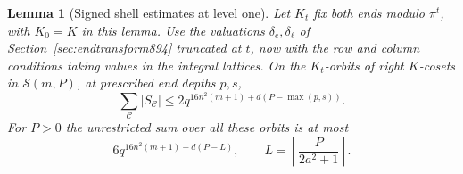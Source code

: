 \documentclass[a4paper,11pt]{article}
\newtheorem{lemma}[proposition]{Lemma}
\theoremstyle{definition}
\theoremstyle{remark}
\numberwithin{equation}{section}
\begin{document}
\begin{lemma}[Signed shell estimates at level one]
\leavevmode\label{lem:standardrows899}
Let \(K_t\) fix both ends modulo \(\pi^t\), with \(K_0=K\) in
this lemma. Use the valuations \(\delta_e,\delta_\ell\) of
Section~\ref{sec:endtransform894} truncated at \(t\), now with
the row and column conditions taking values in the integral
lattices. On the \(K_t\)-orbits of right \(K\)-cosets in
\(\mathcal S(m,P)\), at prescribed end depths \(p,s\),
\[
      \sum_{\mathcal C}|S_{\mathcal C}|
            \le 2q^{16n^2(m+1)+d(P-\max(p,s))}.
\]
For \(P>0\) the unrestricted sum over all these orbits is at most
\begin{equation}
     6q^{16n^2(m+1)+d(P-L)},\qquad
                L=\left\lceil\frac{P}{2a^2+1}\right\rceil .
 \label{eq:standardshell899}
\end{equation}
\end{lemma}
\end{document}
